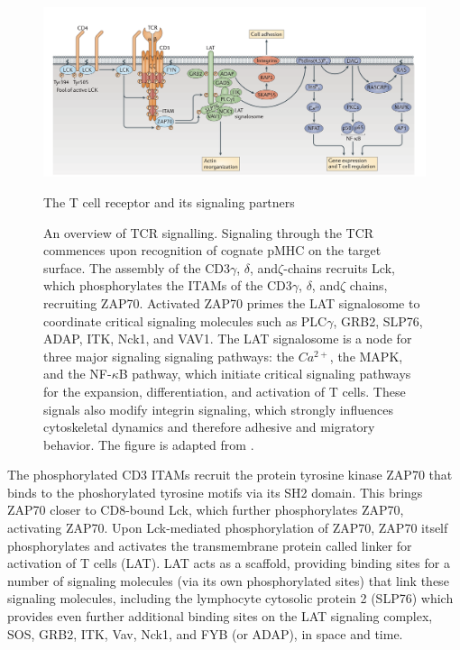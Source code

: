 \begin{figure}[htbp]
	\centering
	\includegraphics[width=\textwidth]{../figures/chapter1/tcrsignaling.png}
	\caption{The T cell receptor and its signaling partners}
	\caption*{An overview of TCR signalling.  Signaling through the TCR commences upon recognition of cognate pMHC on the target surface. The assembly of the CD3$\gamma$, $\delta$,  and$\zeta$-chains recruits Lck, which phosphorylates the ITAMs of the CD3$\gamma$, $\delta$,  and$\zeta$ chains, recruiting ZAP70.  Activated ZAP70 primes the LAT signalosome to coordinate critical signaling molecules such as PLC$\gamma$, GRB2, SLP76, ADAP, ITK, Nck1, and VAV1.  The LAT signalosome is a node for three major signaling signaling pathways: the $Ca^{2+}$, the MAPK, and the NF-$\kappa$B pathway, which initiate critical signaling pathways for the expansion, differentiation, and activation of T cells. These signals also modify integrin signaling, which strongly influences cytoskeletal dynamics and therefore adhesive and migratory behavior.  The figure is adapted from \cite{Brownlie2013}.}
	\label{fig:tcrsignaling}
\end{figure}

The phosphorylated CD3 ITAMs recruit the protein tyrosine kinase ZAP70 that binds to the phoshorylated tyrosine motifs via its SH2 domain.  This brings ZAP70 closer to CD8-bound Lck, which further phosphorylates ZAP70, activating ZAP70. Upon Lck-mediated phosphorylation of ZAP70,  ZAP70 itself phosphorylates and activates the transmembrane protein called linker for activation of T cells (LAT). LAT acts as a scaffold, providing binding sites for a number of signaling molecules (via its own phosphorylated sites) that link these signaling molecules, including the lymphocyte cytosolic protein 2 (SLP76) which provides even further additional binding sites on the LAT signaling complex, SOS,  GRB2, ITK, Vav, Nck1, and FYB (or ADAP), in space and time.  

